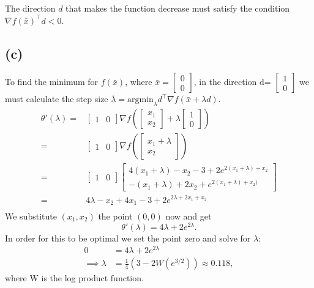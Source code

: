 \documentclass{article}
\begin{document}
	The direction $d$ that makes the function decrease must satisfy the condition $\nabla f(\bar{x})^\top d <0$.
\subsection*{(c)}
	To find the minimum for $f(\bar{x})$, where $\bar{x}=\begin{bmatrix}0 \\ 0\end{bmatrix}$, in the direction d= $\begin{bmatrix}1 \\ 0\end{bmatrix}$ we must calculate the step size $\bar{\lambda}=\text{argmin}_{\lambda} d^\top \nabla f(\bar{x}+ \lambda d)$. 
	\begin{align}
		\theta'(\lambda)= &\begin{bmatrix}
			1 & 0
		\end{bmatrix}
		\nabla f
		\left(\begin{bmatrix}
			x_1 \\
			x_2
		\end{bmatrix}+
		\lambda
		\begin{bmatrix}
			1 \\
			 0
		 \end{bmatrix}\right) \\
	=&
	 \begin{bmatrix}
	 	1 & 0
	 \end{bmatrix}
	 \nabla f\left(
	 \begin{bmatrix}
	 	x_1+\lambda \\
	 	x_2
	 \end{bmatrix}\right) \\
 	=&
	 \begin{bmatrix}
 		1 & 0
 	\end{bmatrix}
	\begin{bmatrix}
 		4(x_1+\lambda)-x_2 -3+ 2 e^{2 (x_1+\lambda) + x_2 } \\
 		-(x_1+\lambda)+2x_2 + e^{2(x_1+\lambda)+x_2)}
 	\end{bmatrix} \\
 	 =&
 		4\lambda-x_2 + 4x_1-3+ 2 e^{2\lambda + 2 x_1 + x_2 } \\
	\end{align}
	We substitute $(x_1,x_2)$ the point $(0,0)$ now and get
	\begin{equation}
		\theta'(\lambda)= 4\lambda +2 e^{2\lambda}.
	\end{equation}
	In order for this to be optimal we set the point zero and solve for $\lambda$:
	\begin{align}
		0 &= 4 \lambda + 2e^{2\lambda}\\
		\implies \lambda &= \frac{1}{4} (3 - 2 W(e^{3/2})) \approx 0.118,
	\end{align}
	where W is the log product function.
	
\end{document}
